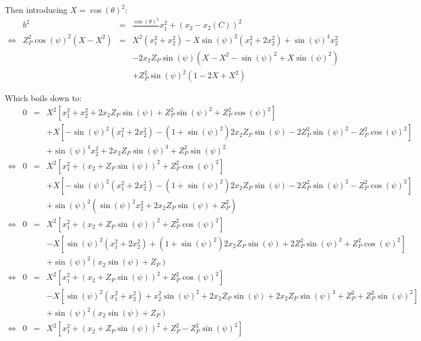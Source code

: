 \documentclass[a4paper,11pt,twoside,titlepage,openright]{book}
\numberwithin{equation}{section}
\newcommand{\lt}{\left}
\newcommand{\rt}{\right}
\DeclareMathOperator{\DD}{\cos(\theta)^2 - \sin(\psi)^2}
\begin{document}
Then introducing $X = \cos(\theta)^2$:
$$
\begin{array}{lllll}
	& b^2 & = & \frac{\cos(\theta)^2}{\DD}x_1^2 + \lt(x_2 - x_2(C)\rt)^2\\
    \Leftrightarrow
    &  Z_P^2\cos(\psi)^2\lt(X-X^2\rt) & = & X^2\lt(x_1^2+x_2^2\rt) - X\sin(\psi)^2\lt(x_1^2+2x_2^2\rt) + \sin(\psi)^4x_2^2\\
    & & & - 2x_2Z_P\sin(\psi)\lt(X - X^2 - \sin(\psi)^2 + X\sin(\psi)^2\rt)\\
    & & & + Z_P^2\sin(\psi)^2\lt(1 - 2X + X^2\rt)
\end{array}
$$

Which boils down to:
$$
\begin{array}{lllll}
    & 0 & = & X^2\lt[ x_1^2+x_2^2 + 2x_2Z_P\sin(\psi) + Z_P^2\sin(\psi)^2 + Z_P^2\cos(\psi)^2 \rt]\\
    & & & + X\lt[ -\sin(\psi)^2\lt(x_1^2+2x_2^2\rt) - \lt(1+\sin(\psi)^2\rt)2x_2Z_P\sin(\psi) - 2Z_P^2\sin(\psi)^2 - Z_P^2\cos(\psi)^2\rt]\\
    & & & + \sin(\psi)^4x_2^2 + 2x_2Z_P\sin(\psi)^3 + Z_P^2\sin(\psi)^2\\
    \Leftrightarrow
    & 0 & = & X^2\lt[ x_1^2 + \lt(x_2 + Z_P\sin(\psi)\rt)^2 + Z_P^2\cos(\psi)^2 \rt]\\
    & & & + X\lt[ -\sin(\psi)^2\lt(x_1^2+2x_2^2\rt) - \lt(1+\sin(\psi)^2\rt)2x_2Z_P\sin(\psi) - 2Z_P^2\sin(\psi)^2 - Z_P^2\cos(\psi)^2\rt]\\
    & & & + \sin(\psi)^2\lt(\sin(\psi)^2x_2^2 + 2x_2Z_P\sin(\psi) + Z_P^2\rt)\\
    \Leftrightarrow
    & 0 & = & X^2\lt[ x_1^2 + \lt(x_2 + Z_P\sin(\psi)\rt)^2 + Z_P^2\cos(\psi)^2 \rt]\\
    & & & - X\lt[ \sin(\psi)^2\lt(x_1^2+2x_2^2\rt) + \lt(1+\sin(\psi)^2\rt)2x_2Z_P\sin(\psi) + 2Z_P^2\sin(\psi)^2 + Z_P^2\cos(\psi)^2\rt]\\
    & & & + \sin(\psi)^2\lt(x_2\sin(\psi) + Z_P\rt)\\
    \Leftrightarrow
    & 0 & = & X^2\lt[ x_1^2 + \lt(x_2 + Z_P\sin(\psi)\rt)^2 + Z_P^2\cos(\psi)^2 \rt]\\
    & & & - X\lt[ \sin(\psi)^2\lt(x_1^2+x_2^2\rt) + x_2^2\sin(\psi)^2 + 2x_2Z_P\sin(\psi) + 2x_2Z_P\sin(\psi)^3 + Z_P^2 + Z_P^2\sin(\psi)^2\rt]\\
    & & & + \sin(\psi)^2\lt(x_2\sin(\psi) + Z_P\rt)\\
    \Leftrightarrow
    & 0 & = & X^2\lt[ x_1^2 + \lt(x_2 + Z_P\sin(\psi)\rt)^2 + Z_P^2 - Z_P^2\sin(\psi)^2 \rt]\\

\end{array}$$
\end{document}

